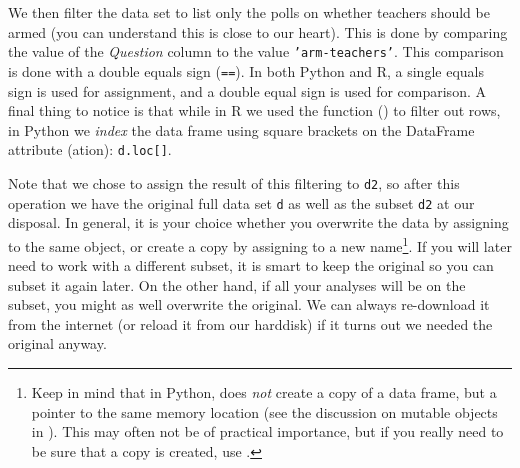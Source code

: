 We then filter the data set to list only the polls on whether teachers should be armed
(you can understand this is close to our heart).
This is done by comparing the value of the \emph{Question} column to the value \texttt{'arm-teachers'}.
This comparison is done with a double equals sign (\verb+==+).
In both Python and R, a single equals sign is used for assignment,
and a double equal sign is used for comparison.
A final thing to notice is that while in R we used the  function () to filter out rows,
in Python we \emph{index} the data frame using square brackets on the  DataFrame attribute (ation): \verb+d.loc[]+.

Note that we chose to assign the result of this filtering to \texttt{d2},
so after this operation we have the original full data set \texttt{d} as well as the subset \texttt{d2} at our disposal.
In general, it is your choice whether you overwrite the data by assigning to the same object,
or create a copy by assigning to a new name\footnote{Keep in mind that in Python,  does \emph{not} create a copy of a data frame, but a pointer to the same memory location (see the discussion on mutable objects in ). This may often not be of practical importance, but if you really need to be sure that a copy is created, use .}.
If you will later need to work with a different subset, it is smart to keep the original so you can subset it again later.
On the other hand, if all your analyses will be on the subset, you might as well overwrite the original.
We can always re-download it from the internet (or reload it from our harddisk) if it turns out we needed the original anyway. 



